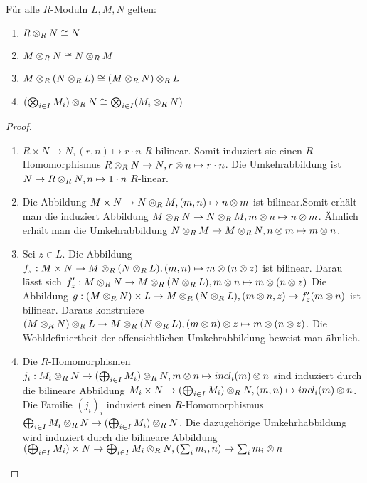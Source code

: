 \documentclass[../main.tex]{subfiles}
\begin{document}
\begin{lemma}
    Für alle $R$-Moduln $L,M,N$ gelten:
    \begin{enumerate}[label=(\roman*)]
        \item $R\otimes_R N \cong N$
        \item $M\otimes_R N \cong N\otimes_R M$
        \item $M\otimes_R (N\otimes_R L) \cong (M\otimes_R N)\otimes_R L$
        \item $(\bigotimes_{i\in I} M_i)\otimes_R N \cong \bigotimes_{i\in I} (M_i\otimes_R N)$
    \end{enumerate}
\end{lemma}

\begin{proof}$ $
    \begin{enumerate}[label=(\roman*)]
        \item
        $R\times N \rightarrow N, (r,n)\mapsto r\cdot n$ $R$-bilinear.
        Somit induziert sie einen $R$-Homomorphismus $R\otimes_R N\rightarrow N, r\otimes n\mapsto r\cdot n$.
        Die Umkehrabbildung ist $N\rightarrow R\otimes_R N, n\mapsto 1\cdot n$ $R$-linear.
        \item 
        Die Abbildung $M\times N\rightarrow N\otimes_R M, (m,n)\mapsto n\otimes m$ ist bilinear.Somit erhält man die induziert Abbildung $M\otimes_R N \rightarrow N\otimes_R M, m\otimes n\mapsto n\otimes m$.
        Ähnlich erhält man die Umkehrabbildung $N\otimes_R M \rightarrow M\otimes_R N, n\otimes m \mapsto m\otimes n$.
        \item 
        Sei $z\in L$. Die Abbildung $f_z:M\times N\rightarrow M\otimes_R(N\otimes_R L), (m,n) \mapsto m\otimes (n\otimes z)$ ist bilinear.
        Darau lässt sich $f'_z:M\otimes_R N \rightarrow M \otimes_R(N\otimes_R L), m\otimes n\mapsto m\otimes(n\otimes z)$
        Die Abbildung $g:(M\otimes_R N)\times L \rightarrow M \otimes_R ( N\otimes_R L), (m\otimes n,z) \mapsto f'_z (m\otimes n)$ ist bilinear.
        Daraus konstruiere $(M\otimes_R N)\otimes_R L \rightarrow M \otimes_R (N\otimes_R L), (m\otimes n)\otimes z \mapsto m\otimes (n\otimes z)$.
        Die Wohldefiniertheit der offensichtlichen Umkehrabbildung beweist man ähnlich.
        \item 
        Die $R$-Homomorphismen $j_i:M_i\otimes_R N \rightarrow(\bigoplus_{i\in I} M_i) \otimes_R N, m\otimes n\mapsto incl_i(m)\otimes n$ sind induziert durch die bilineare Abbildung $M_i\times N \rightarrow (\bigoplus_{i\in I} M_i) \otimes_R N, (m,n) \mapsto incl_i(m) \otimes n$.
        Die Familie $(j_i)_i$ induziert einen $R$-Homomorphismus $\bigoplus_{i\in I} M_i\otimes_R N \rightarrow (\bigoplus_{i\in I} M_i) \otimes_R N$.
        Die dazugehörige Umkehrhabbildung wird induziert durch die bilineare Abbildung $(\bigoplus_{i\in I} M_i) \times N \rightarrow \bigoplus_{i\in I} M_i \otimes_R N, (\sum_i m_i,n)\mapsto \sum_i m_i\otimes n$ 
        
    \end{enumerate}
\end{proof}
\end{document}
